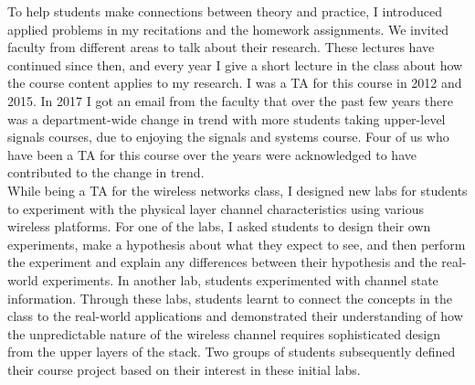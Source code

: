 \documentclass[10pt]{article}
\begin{document}
To help students make connections between theory and practice,  I introduced applied problems in my recitations and the homework assignments. We invited faculty from different areas to talk about their research. These lectures have continued since then, and every year I give a short lecture in the class about how the course content applies to my research.  I was a TA for this course in 2012 and 2015. In 2017 I got an email from the faculty that over the past few years there was a department-wide change in trend with more students taking upper-level signals courses, due to enjoying the signals and systems course. Four of us who have been a TA for this course over the years were acknowledged to have contributed to the change in trend. \\

While being a TA for the wireless networks class, I designed new labs for students to experiment with the physical layer channel characteristics using various wireless platforms. 
For one of the labs, I asked students to design their own experiments, make a hypothesis about what they expect to see, and then perform the experiment and explain any differences between their hypothesis and the real-world experiments. In another lab, students experimented with channel state information. Through these labs, students learnt to connect the concepts in the class to the real-world applications and demonstrated their understanding of how the unpredictable nature of the wireless channel requires sophisticated design from the upper layers of the stack. Two groups of students subsequently defined their course project based on their interest in these initial labs. \\ 
\end{document}
